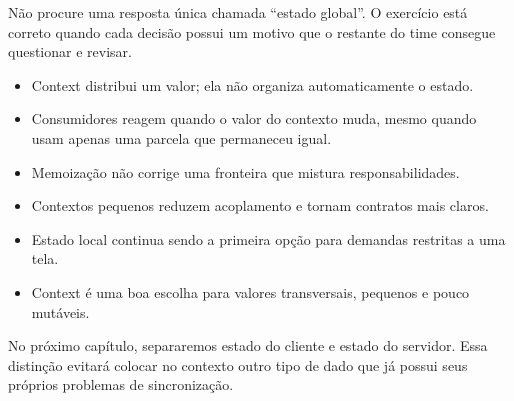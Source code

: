 
Não procure uma resposta única chamada ``estado global''. O exercício está
correto quando cada decisão possui um motivo que o restante do time consegue
questionar e revisar.

\begin{resumo}
\begin{itemize}
  \item Context distribui um valor; ela não organiza automaticamente o estado.
  \item Consumidores reagem quando o valor do contexto muda, mesmo quando usam
    apenas uma parcela que permaneceu igual.
  \item Memoização não corrige uma fronteira que mistura responsabilidades.
  \item Contextos pequenos reduzem acoplamento e tornam contratos mais claros.
  \item Estado local continua sendo a primeira opção para demandas restritas a
    uma tela.
  \item Context é uma boa escolha para valores transversais, pequenos e pouco
    mutáveis.
\end{itemize}
\end{resumo}

No próximo capítulo, separaremos estado do cliente e estado do servidor. Essa
distinção evitará colocar no contexto outro tipo de dado que já possui seus
próprios problemas de sincronização.
